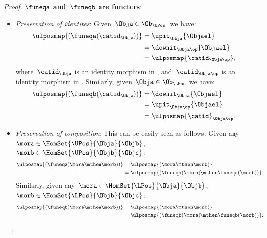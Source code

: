 \begin{proof}
    \textbf{$\funeqa$ and~$\funeqb$ are functors}:
    \begin{itemize}
        \item \emph{Preservation of identites}: Given~$\Obja\in \Ob_{\UPos}$, we have:
              \begin{equation*}
                  \begin{aligned}
                      \ulposmap{(\funeqa(\catid_\Obja))} & =\upit_\Obja\{\Objael\}        \\
                                                         & =\downit_{\Obja\op}\{\Objael\} \\
                                                         & =\ulposmap{\catid_{\Obja\op}},
                  \end{aligned}
              \end{equation*}
              where~$\catid_\Obja$ is an identity morphism in \UPos, and~$\catid_{\Obja\op}$ is an identity morphism in \LPos.
              Similarly, given~$\Obja\in \Ob_{\LPos}$ we have:
              \begin{equation*}
                  \begin{aligned}
                      \ulposmap{(\funeqb(\catid_\Obja))} & =\downit_\Obja\{\Objael\}      \\
                                                         & =\upit_{\Obja\op}\{\Objael\}   \\
                                                         & =\ulposmap{\catid}_{\Obja\op}.
                  \end{aligned}
              \end{equation*}
        \item \emph{Preservation of composition}: This can be easily seen as follows.
              Given any~$\mora\in \HomSet{\UPos}{\Obja}{\Objb}$,~$\morb\in \HomSet{\UPos}{\Objb}{\Objc}$:
              \begin{equation*}
                  \begin{aligned}
                      \ulposmap{(\funeqa(\mora \mthen \morb))} & =\ulposmap{(\mora\mthen \morb)}                    \\
                                                               & =\ulposmap{(\funeqa(\mora)\mthen \funeqa(\morb))}.
                  \end{aligned}
              \end{equation*}
              Similarly, given any~$\mora\in \HomSet{\LPos}{\Obja}{\Objb}$,~$\morb\in \HomSet{\LPos}{\Objb}{\Objc}$:
              \begin{equation*}
                  \begin{aligned}
                      \ulposmap{(\funeqb(\mora \mthen \morb))} & =\ulposmap{(\mora \mthen \morb)}                   \\
                                                               & =\ulposmap{(\funeqb(\mora)\mthen \funeqb(\morb))}.
                  \end{aligned}
              \end{equation*}
    \end{itemize}


\end{proof}
